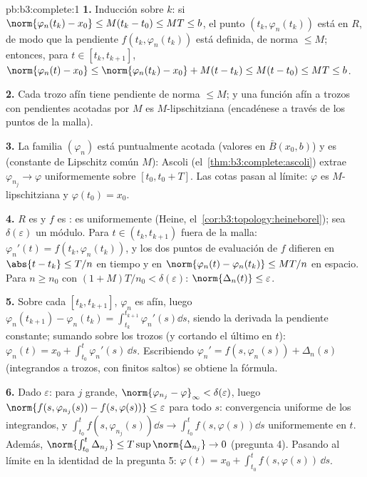 \begin{solution}{pb:b3:complete:1}
\textbf{1.} Inducción sobre $k$: si $\norm{\varphi_n(t_k) - x_0}
\leq M(t_k - t_0) \leq MT \leq b$, el punto $(t_k,
\varphi_n(t_k))$ está en $R$, de modo que la pendiente $f(t_k,
\varphi_n(t_k))$ está definida, de norma $\leq M$; entonces, para $t \in
[t_k, t_{k+1}]$, $\norm{\varphi_n(t) - x_0} \leq
\norm{\varphi_n(t_k) - x_0} + M(t - t_k) \leq M(t - t_0) \leq
MT \leq b$.

\textbf{2.} Cada trozo afín tiene pendiente de norma $\leq M$; y una
función afín a trozos con pendientes acotadas por $M$ es
$M$-lipschitziana (encadénese a través de los puntos de la malla).

\textbf{3.} La familia $(\varphi_n)$ está puntualmente acotada (valores
en $\bar B(x_0, b)$) y es
 (constante de
Lipschitz común $M$): Ascoli (el~\cref{thm:b3:complete:ascoli}) extrae
$\varphi_{n_j} \to
\varphi$ uniformemente sobre $[t_0, t_0 + T]$. Las cotas pasan al
límite: $\varphi$ es $M$-lipschitziana y $\varphi(t_0) = x_0$.

\textbf{4.} $R$ es  y $f$ es
: es uniformemente
 (Heine,
el~\cref{cor:b3:topology:heineborel}); sea $\delta(\varepsilon)$ un
módulo. Para $t \in (t_k,
t_{k+1})$ fuera de la malla: $\varphi_n'(t) = f(t_k, \varphi_n(t_k))$, y
los dos puntos de evaluación de $f$ difieren en $\abs{t - t_k} \leq T/n$
en tiempo y en $\norm{\varphi_n(t) - \varphi_n(t_k)} \leq MT/n$ en
espacio. Para $n \geq n_0$ con $(1 + M)T/n_0 < \delta(\varepsilon)$:
$\norm{\Delta_n(t)} \leq \varepsilon$.

\textbf{5.} Sobre cada $[t_k, t_{k+1}]$, $\varphi_n$ es afín, luego
$\varphi_n(t_{k+1}) - \varphi_n(t_k) = \int_{t_k}^{t_{k+1}}
\varphi_n'(s)\dd s$, siendo la derivada la pendiente constante; sumando
sobre los trozos (y cortando el último en $t$):
$\varphi_n(t) = x_0 + \int_{t_0}^t\varphi_n'(s)\,\dd s$.
Escribiendo $\varphi_n' = f(s, \varphi_n(s)) + \Delta_n(s)$ (integrandos
 a trozos, con finitos
saltos) se obtiene la fórmula.

\textbf{6.} Dado $\varepsilon$: para $j$ grande,
$\norm{\varphi_{n_j} - \varphi}_\infty < \delta(\varepsilon)$,
luego $\norm{f(s, \varphi_{n_j}(s)) - f(s, \varphi(s))} \leq
\varepsilon$ para todo $s$: convergencia uniforme de los integrandos, y
$\int_{t_0}^t f(s,\varphi_{n_j}(s))\dd s \to
\int_{t_0}^tf(s, \varphi(s))\dd s$ uniformemente en $t$. Además,
$\norm{\int_{t_0}^t\Delta_{n_j}} \leq T\sup\norm{\Delta_{n_j}}
\to 0$ (pregunta 4). Pasando al límite en la identidad de la pregunta 5:
$\varphi(t) = x_0 + \int_{t_0}^tf(s,
\varphi(s))\,\dd s$.


\end{solution}
